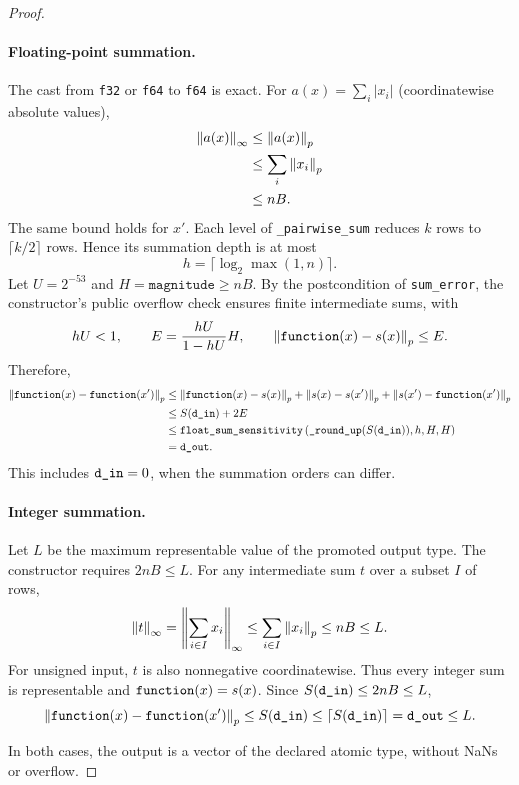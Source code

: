 \documentclass{article}
\begin{document}
\begin{proof}
\paragraph{Floating-point summation.}
The cast from \texttt{f32} or \texttt{f64} to \texttt{f64} is exact.
For $a(x)=\sum_i|x_i|$ (coordinatewise absolute values),
\begin{align*}
    \norm{a(x)}_\infty
    &\le \norm{a(x)}_p\\
    &\le \sum_i\norm{x_i}_p\\
    &\le nB.
\end{align*}
The same bound holds for $x'$.
Each level of \texttt{\_pairwise\_sum} reduces $k$ rows to $\lceil k/2\rceil$ rows.
Hence its summation depth is at most
\[
    h=\lceil\log_2\max(1,n)\rceil.
\]
Let $U=2^{-53}$ and $H=\texttt{magnitude}\ge nB$.
By the postcondition of \texttt{sum\_error}, the constructor's public overflow check ensures finite intermediate sums, with
\[
    hU<1,\qquad
    E=\frac{hU}{1-hU}H,\qquad
    \norm{\texttt{function}(x)-s(x)}_p\le E.
\]
Therefore,
\begin{align*}
    \norm{\texttt{function}(x)-\texttt{function}(x')}_p
    &\le \norm{\texttt{function}(x)-s(x)}_p
        +\norm{s(x)-s(x')}_p
        +\norm{s(x')-\texttt{function}(x')}_p\\
    &\le S(\texttt{d\_in})+2E\\
    &\le \texttt{float\_sum\_sensitivity}
        \left(\texttt{\_round\_up}(S(\texttt{d\_in})),h,H,H\right)\\
    &=\texttt{d\_out}.
\end{align*}
This includes $\texttt{d\_in}=0$, when the summation orders can differ.

\paragraph{Integer summation.}
Let $L$ be the maximum representable value of the promoted output type.
The constructor requires $2nB\le L$.
For any intermediate sum $t$ over a subset $I$ of rows,
\[
    \norm{t}_\infty
    =\norm{\sum_{i\in I}x_i}_\infty
    \le \sum_{i\in I}\norm{x_i}_p
    \le nB\le L.
\]
For unsigned input, $t$ is also nonnegative coordinatewise.
Thus every integer sum is representable and $\texttt{function}(x)=s(x)$.
Since $S(\texttt{d\_in})\le 2nB\le L$,
\[
    \norm{\texttt{function}(x)-\texttt{function}(x')}_p
    \le S(\texttt{d\_in})\le \lceil S(\texttt{d\_in})\rceil=\texttt{d\_out}\le L.
\]

In both cases, the output is a vector of the declared atomic type, without NaNs or overflow.
\end{proof}
\end{document}
